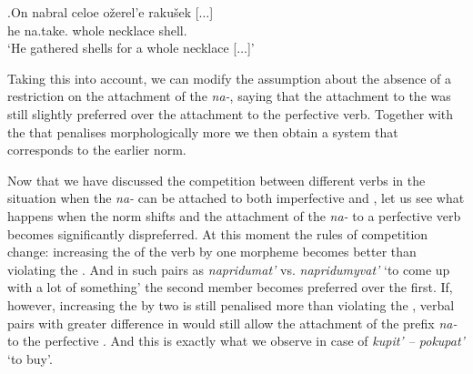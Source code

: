 \exg.\label{ex:nabrat}On nabral celoe o\v{z}erel'e raku\v{s}ek [$\ldots$]\\
he na.take. whole necklace shell.\\
\trans `He gathered shells for a whole necklace [$\ldots$]'\\

Taking this into account, we can modify the assumption about the absence of a restriction on the attachment of the  \textit{na-}, saying that the attachment to the  was still slightly preferred over the attachment to the perfective verb. Together with the  that penalises morphologically more  we then obtain a system that corresponds to the earlier norm. 

Now that we have discussed the competition between different verbs in the situation when the  \textit{na-} can be attached to both imperfective and , let us see what happens when the norm shifts and the attachment of the  \textit{na-} to a perfective verb becomes significantly dispreferred. At this moment the rules of competition change: increasing the  of the verb by one morpheme becomes better than violating the . And in such pairs as \textit{napridumat'} vs. \textit{napridumyvat'} `to come up with a lot of something' the second member becomes preferred over the first. If, however, increasing the  by two is still penalised more than violating the , verbal pairs with greater difference in  would still allow the attachment of the  prefix \textit{na-} to the perfective . And this is exactly what we observe in case of \textit{kupit' -- pokupat'} `to buy'.

